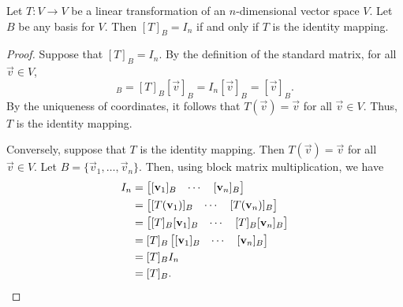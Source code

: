 \documentclass{homework}
\begin{document}
	\question Let $T : V \to V$ be a linear transformation of an $n$-dimensional vector space $V$. Let $B$ be any basis for $V$. Then $[T]_B = I_n$ if and only if $T$ is the identity mapping.
	\begin{proof}
		Suppose that $[T]_B = I_n$. By the definition of the standard matrix, for all $\vec{v} \in V$,
		\begin{equation*}
			[T(\vec{v})]_B = [T]_B[\vec{v}]_B = I_n[\vec{v}]_B = [\vec{v}]_B.
		\end{equation*}
		By the uniqueness of coordinates, it follows that $T(\vec{v}) = \vec{v}$ for all $\vec{v} \in V$. Thus, $T$ is the identity mapping.
		
		Conversely, suppose that $T$ is the identity mapping. Then $T(\vec{v}) = \vec{v}$ for all $\vec{v} \in V$. Let $B = \{\vec{v}_1, \dots, \vec{v}_n\}$. Then, using block matrix multiplication, we have
		\begin{equation*}
			\begin{aligned}
			I_n &= \left[\begin{matrix}[\mathbf{v}_1]_B & \cdots& [\mathbf{v}_n]_B\end{matrix}\right] \\
			&= \left[\begin{matrix}[T(\mathbf{v}_1)]_B & \cdots& [T(\mathbf{v}_n)]_B\end{matrix}\right] \\
			&= \left[\begin{matrix}[T]_B[\mathbf{v}_1]_B & \cdots&[T]_B [\mathbf{v}_n]_B\end{matrix}\right] \\
			&= [T]_B \left[\begin{matrix}[\mathbf{v}_1]_B & \cdots& [\mathbf{v}_n]_B\end{matrix}\right] \\
			&= [T]_B I_n \\
			&= [T]_B.
			\end{aligned}
		\end{equation*}
	\end{proof}
	
\end{document}
